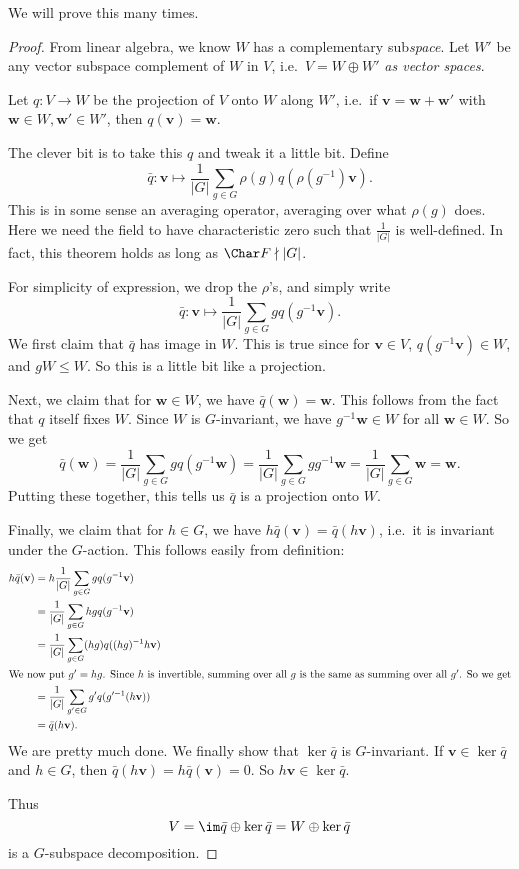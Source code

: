 \documentclass[a4paper]{article}
\begin{document}
We will prove this many times.
\begin{proof}
  From linear algebra, we know $W$ has a complementary sub\emph{space}. Let $W'$ be any vector subspace complement of $W$ in $V$, i.e.\ $V = W \oplus W'$ \emph{as vector spaces}.

  Let $q: V \to W$ be the projection of $V$ onto $W$ along $W'$, i.e.\ if $\mathbf{v} = \mathbf{w} + \mathbf{w}'$ with $\mathbf{w} \in W, \mathbf{w}' \in W'$, then $q(\mathbf{v}) = \mathbf{w}$.

  The clever bit is to take this $q$ and tweak it a little bit. Define
  \[
    \bar{q}: \mathbf{v} \mapsto \frac{1}{|G|} \sum_{g \in G} \rho(g) q (\rho(g^{-1})\mathbf{v}).
  \]
  This is in some sense an averaging operator, averaging over what $\rho(g)$ does. Here we need the field to have characteristic zero such that $\frac{1}{|G|}$ is well-defined. In fact, this theorem holds as long as $\Char F \nmid |G|$.

  For simplicity of expression, we drop the $\rho$'s, and simply write
  \[
    \bar{q}: \mathbf{v} \mapsto \frac{1}{|G|} \sum_{g \in G} g q (g^{-1}\mathbf{v}).
  \]
  We first claim that $\bar{q}$ has image in $W$. This is true since for $\mathbf{v} \in V$, $q(g^{-1} \mathbf{v}) \in W$, and $gW \leq W$. So this is a little bit like a projection.

  Next, we claim that for $\mathbf{w} \in W$, we have $\bar{q}(\mathbf{w}) = \mathbf{w}$. This follows from the fact that $q$ itself fixes $W$. Since $W$ is $G$-invariant, we have $g^{-1} \mathbf{w} \in W$ for all $\mathbf{w} \in W$. So we get
  \[
    \bar{q}(\mathbf{w}) = \frac{1}{|G|} \sum_{g \in G} g q(g^{-1}\mathbf{w}) = \frac{1}{|G|} \sum_{g \in G} gg^{-1}\mathbf{w} = \frac{1}{|G|} \sum_{g \in G}\mathbf{w} = \mathbf{w}.
  \]
  Putting these together, this tells us $\bar{q}$ is a projection onto $W$.

  Finally, we claim that for $h \in G$, we have $h \bar{q}(\mathbf{v}) = \bar{q}(h\mathbf{v})$, i.e.\ it is invariant under the $G$-action. This follows easily from definition:
  \begin{align*}
    h \bar{q} (\mathbf{v}) &= h\frac{1}{|G|} \sum_{g \in G} g q (g^{-1}\mathbf{v})\\
    &= \frac{1}{|G|} \sum_{g \in G} hg q (g^{-1} \mathbf{v})\\
    &= \frac{1}{|G|} \sum_{g \in G} (hg) q ((hg)^{-1} h\mathbf{v})\\
    \intertext{We now put $g' = hg$. Since $h$ is invertible, summing over all $g$ is the same as summing over all $g'$. So we get}
    &= \frac{1}{|G|} \sum_{g' \in G} g' q(g'^{-1}(h\mathbf{v}))\\
    &= \bar{q} (h\mathbf{v}).
  \end{align*}
  We are pretty much done. We finally show that $\ker \bar{q}$ is $G$-invariant. If $\mathbf{v} \in \ker \bar{q}$ and $h \in G$, then $\bar{q}(h\mathbf{v}) = h\bar{q}(\mathbf{v}) = 0$. So $h\mathbf{v} \in \ker \bar{q}$.

  Thus
  \[
    V = \im \bar{q} \oplus \ker \bar{q} = W \oplus \ker\bar{q}
  \]
  is a $G$-subspace decomposition.
\end{proof}
\end{document}
